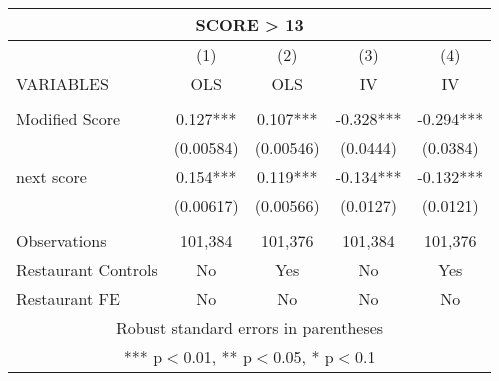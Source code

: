 \begin{tabular}{lcccc}
\multicolumn{5}{c}{SCORE > 13} \\ \hline
 & (1) & (2) & (3) & (4) \\
VARIABLES & OLS & OLS & IV & IV \\ \hline
 &  &  &  &  \\
Modified Score & 0.127*** & 0.107*** & -0.328*** & -0.294*** \\
 & (0.00584) & (0.00546) & (0.0444) & (0.0384) \\
next score & 0.154*** & 0.119*** & -0.134*** & -0.132*** \\
 & (0.00617) & (0.00566) & (0.0127) & (0.0121) \\
 &  &  &  &  \\
Observations & 101,384 & 101,376 & 101,384 & 101,376 \\
Restaurant Controls & No & Yes & No & Yes \\
 Restaurant FE & No & No & No & No \\ \hline
\multicolumn{5}{c}{ Robust standard errors in parentheses} \\
\multicolumn{5}{c}{ *** p$<$0.01, ** p$<$0.05, * p$<$0.1} \\
\end{tabular}
